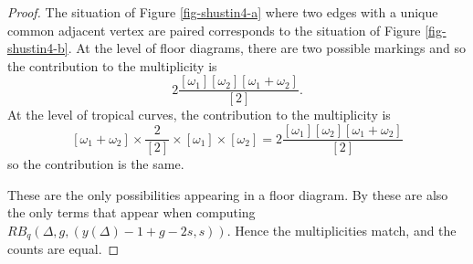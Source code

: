 \begin{proof}
The situation of Figure \ref{fig-shustin4-a} where two edges with a unique common adjacent vertex are paired corresponds to the situation of Figure \ref{fig-shustin4-b}. At the level of floor diagrams, there are two possible markings and so the contribution to the multiplicity is
\[ 2 \dfrac{[\omega_1][\omega_2][\omega_1+\omega_2]}{[2]}. \]
At the level of tropical curves, the contribution to the multiplicity is
\[ [\omega_1+\omega_2] \times  \dfrac{2}{[2]} \times [\omega_1] \times [\omega_2] = 2 \dfrac{[\omega_1][\omega_2][\omega_1+\omega_2]}{[2]} \]
so the contribution is the same.

These are the only possibilities appearing in a floor diagram. By \cite[Lemma 4.6]{shustin-2024-refined} these are also the only terms that appear when computing $RB_q(\Delta,g,(y(\Delta)-1+g-2s,s))$. Hence the multiplicities match, and the counts are equal.
\end{proof}


